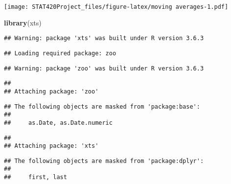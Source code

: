 \documentclass[]{article}
\newenvironment{Shaded}{\begin{snugshade}}{\end{snugshade}}
\newcommand{\DataTypeTok}[1]{\textcolor[rgb]{0.13,0.29,0.53}{#1}}
\newcommand{\DecValTok}[1]{\textcolor[rgb]{0.00,0.00,0.81}{#1}}
\newcommand{\KeywordTok}[1]{\textcolor[rgb]{0.13,0.29,0.53}{\textbf{#1}}}
\newcommand{\NormalTok}[1]{#1}
\newcommand{\OperatorTok}[1]{\textcolor[rgb]{0.81,0.36,0.00}{\textbf{#1}}}
\newcommand{\StringTok}[1]{\textcolor[rgb]{0.31,0.60,0.02}{#1}}
\begin{document}
\texttt{[image: STAT420Project\_files/figure-latex/moving averages-1.pdf]}

\begin{Shaded}
\begin{Highlighting}[]
\KeywordTok{library}\NormalTok{(xts)}
\end{Highlighting}
\end{Shaded}

\begin{verbatim}
## Warning: package 'xts' was built under R version 3.6.3
\end{verbatim}

\begin{verbatim}
## Loading required package: zoo
\end{verbatim}

\begin{verbatim}
## Warning: package 'zoo' was built under R version 3.6.3
\end{verbatim}

\begin{verbatim}
## 
## Attaching package: 'zoo'
\end{verbatim}

\begin{verbatim}
## The following objects are masked from 'package:base':
## 
##     as.Date, as.Date.numeric
\end{verbatim}

\begin{verbatim}
## 
## Attaching package: 'xts'
\end{verbatim}

\begin{verbatim}
## The following objects are masked from 'package:dplyr':
## 
##     first, last
\end{verbatim}

\begin{Shaded}
\end{Shaded}
\end{document}
